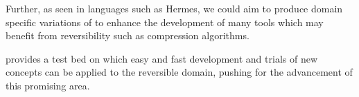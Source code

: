 Further, as seen in languages such as Hermes\cite{Hermes}, we could aim to produce domain specific variations of \rimplang to enhance the development of many tools which may benefit from reversibility such as compression algorithms. 

\rimp provides a test bed on which easy and fast development and trials of new concepts can be applied to the reversible domain, pushing for the advancement of this promising area.